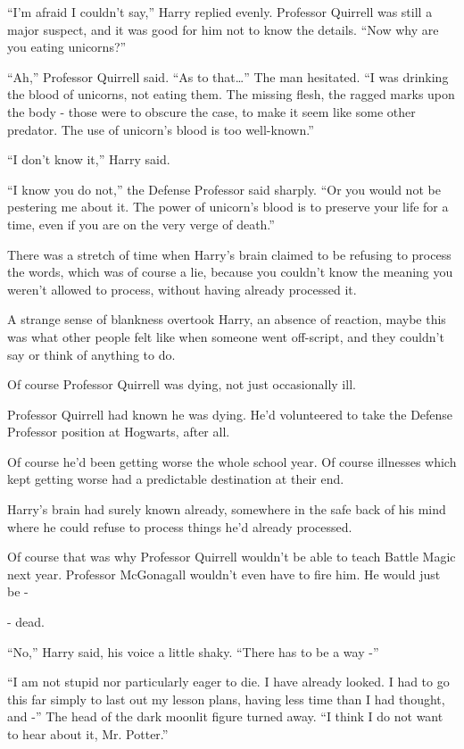 ``I'm afraid I couldn't say,'' Harry replied evenly. Professor Quirrell was still a major suspect, and it was good for him not to know the details. ``Now why are you eating unicorns?''

``Ah,'' Professor Quirrell said. ``As to that\ldots{}'' The man hesitated. ``I was drinking the blood of unicorns, not eating them. The missing flesh, the ragged marks upon the body - those were to obscure the case, to make it seem like some other predator. The use of unicorn's blood is too well-known.''

``I don't know it,'' Harry said.

``I know you do not,'' the Defense Professor said sharply. ``Or you would not be pestering me about it. The power of unicorn's blood is to preserve your life for a time, even if you are on the very verge of death.''

There was a stretch of time when Harry's brain claimed to be refusing to process the words, which was of course a lie, because you couldn't know the meaning you weren't allowed to process, without having already processed it.

A strange sense of blankness overtook Harry, an absence of reaction, maybe this was what other people felt like when someone went off-script, and they couldn't say or think of anything to do.

Of course Professor Quirrell was dying, not just occasionally ill.

Professor Quirrell had known he was dying. He'd volunteered to take the Defense Professor position at Hogwarts, after all.

Of course he'd been getting worse the whole school year. Of course illnesses which kept getting worse had a predictable destination at their end.

Harry's brain had surely known already, somewhere in the safe back of his mind where he could refuse to process things he'd already processed.

Of course that was why Professor Quirrell wouldn't be able to teach Battle Magic next year. Professor McGonagall wouldn't even have to fire him. He would just be -

- dead.

``No,'' Harry said, his voice a little shaky. ``There has to be a way -''

``I am not stupid nor particularly eager to die. I have already looked. I had to go this far simply to last out my lesson plans, having less time than I had thought, and -'' The head of the dark moonlit figure turned away. ``I think I do not want to hear about it, Mr. Potter.''

